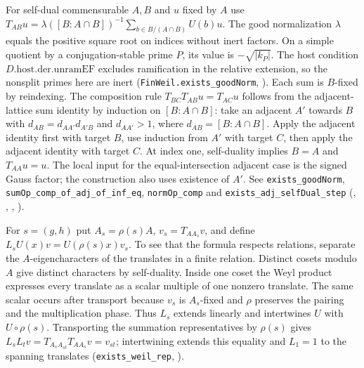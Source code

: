 For self-dual commensurable $A,B$ and $u$ fixed by $A$ use
$T_{AB}u=\lambda([B:A\cap B])^{-1}\sum_{b\in B/(A\cap B)}U(b)u$.
The good normalization $\lambda$ equals the positive square root on
indices without inert factors. On a simple quotient by a
conjugation-stable prime $P$, its value is $-\sqrt{|k_P|}$.
The host condition $D.\mathrm{host.der.unramEF}$ excludes ramification
in the relative extension, so the nonsplit primes here are inert
(\nolinkurl{FinWeil.exists_goodNorm},
).
Each sum is $B$-fixed by reindexing. The composition rule
$T_{BC}T_{AB}u=T_{AC}u$ follows from the adjacent-lattice sum identity
by induction on $[B:A\cap B]$: take an adjacent $A'$ towards $B$
with $d_{AB}=d_{AA'}d_{A'B}$ and $d_{AA'}>1$, where $d_{AB}=[B:A\cap B]$.
Apply the adjacent identity first with target $B$, use induction from
$A'$ with target $C$, then apply the adjacent identity with target $C$.
At index one, self-duality implies $B=A$ and $T_{AA}u=u$. The local
input for the equal-intersection adjacent case is the signed Gauss
factor; the construction also uses existence of $A'$.
See \nolinkurl{exists_goodNorm}, \nolinkurl{sumOp_comp_of_adj_of_inf_eq},
\nolinkurl{normOp_comp} and \nolinkurl{exists_adj_selfDual_step}
(,
,
,
).

For $s=(g,h)$ put $A_s=\rho(s)A$, $v_s=T_{A A_s}v$, and define
$L_sU(x)v=U(\rho(s)x)v_s$. To see that the formula respects relations,
separate the $A$-eigencharacters of the translates in a finite
relation. Distinct cosets modulo $A$ give distinct characters by
self-duality. Inside one coset the Weyl product expresses every
translate as a scalar multiple of one nonzero translate. The same
scalar occurs after transport because $v_s$ is $A_s$-fixed and $\rho$
preserves the pairing and the multiplication phase. Thus $L_s$ extends
linearly and intertwines $U$ with $U\circ\rho(s)$. Transporting the
summation representatives by $\rho(s)$ gives
$L_sL_t v=T_{A_s A_{st}}T_{A A_s}v=v_{st}$; intertwining extends
this equality and $L_1=1$ to the spanning translates
(\nolinkurl{exists_weil_rep},
).

